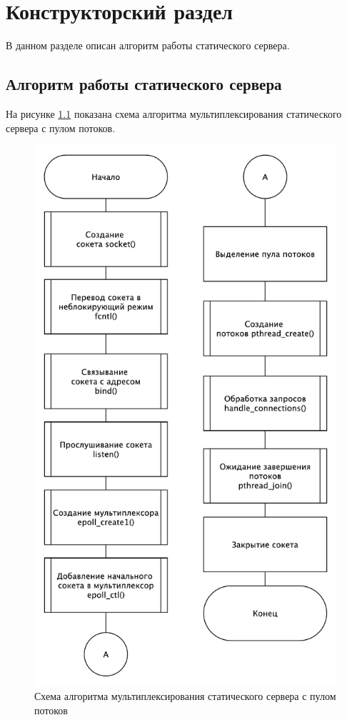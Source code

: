 \chapter{Конструкторский раздел}

В данном разделе описан алгоритм работы статического сервера.

\section{Алгоритм работы статического сервера}

На рисунке \ref{img:server} показана схема алгоритма мультиплексирования статического сервера с пулом потоков.

\begin{figure}[h!]
    \centering
    \includegraphics[scale=0.5]{server.pdf}
    \caption{Схема алгоритма мультиплексирования статического сервера с пулом потоков}
    \label{img:server}
\end{figure}

